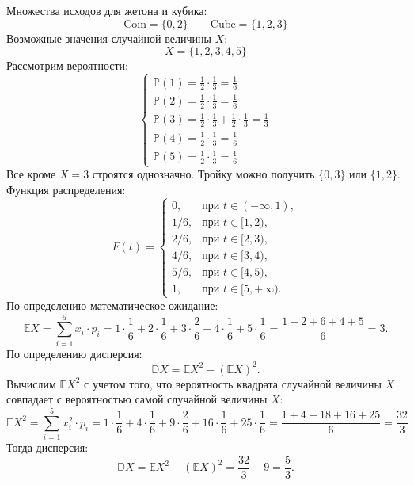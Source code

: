 \documentclass{article}
\begin{document}
\begin{enumerate}
Множества исходов для жетона и кубика:
\begin{equation}
    \text{Coin} = \{0, 2\} \qquad \text{Cube} = \{1, 2, 3\}
\end{equation}
Возможные значения случайной величины $X$:
\begin{equation}
    X = \{1, 2, 3, 4, 5\}
\end{equation}
Рассмотрим вероятности:
\begin{equation}
    \begin{cases}
        \mathbb{P}(1) = \frac{1}{2} \cdot \frac{1}{3} = \frac{1}{6} \\
        \mathbb{P}(2) = \frac{1}{2} \cdot \frac{1}{3} = \frac{1}{6} \\
        \mathbb{P}(3) = \frac{1}{2} \cdot \frac{1}{3} + \frac{1}{2} \cdot \frac{1}{3} = \frac{1}{3} \\
        \mathbb{P}(4) = \frac{1}{2} \cdot \frac{1}{3} = \frac{1}{6} \\
        \mathbb{P}(5) = \frac{1}{2} \cdot \frac{1}{3} = \frac{1}{6}
    \end{cases}
\end{equation}
Все кроме $X=3$ строятся однозначно. Тройку можно получить $\{0, 3\}$ или $\{1, 2\}$. Функция распределения:
\begin{equation}
    F(t) = \begin{cases}
        0, &\text{при } t \in (-\infty, 1),\\
        1/6, &\text{при } t \in [1, 2),\\
        2/6, &\text{при } t \in [2, 3),\\
        4/6, &\text{при } t \in [3, 4),\\
        5/6, &\text{при } t \in [4, 5),\\
        1, &\text{при } t \in [5, +\infty).
    \end{cases}
\end{equation}
По определению математическое ожидание:
\begin{equation}
    \mathbb{E}X = \sum_{i=1}^{5} x_i \cdot p_i = 1 \cdot \frac{1}{6} + 2 \cdot \frac{1}{6} + 3 \cdot \frac{2}{6} + 4 \cdot \frac{1}{6} + 5 \cdot \frac{1}{6} = \frac{1+2+6+4+5}{6} = 3.
\end{equation}
По определению дисперсия:
\begin{equation}
    \mathbb{D}X = \mathbb{E}X^2 - (\mathbb{E}X)^2.
\end{equation}
Вычислим $\mathbb{E}X^2$ с учетом того, что вероятность квадрата случайной величины $X$ совпадает с вероятностью самой случайной величины $X$:
\begin{equation}
    \mathbb{E}X^2 = \sum_{i=1}^{5} x_i^2 \cdot p_i = 1 \cdot \frac{1}{6} + 4 \cdot \frac{1}{6} + 9 \cdot \frac{2}{6} + 16 \cdot \frac{1}{6} + 25 \cdot \frac{1}{6} = \frac{1+4+18+16+25}{6} = \frac{32}{3}
\end{equation}
Тогда дисперсия:
\begin{equation}
    \mathbb{D}X = \mathbb{E}X^2 - (\mathbb{E}X)^2 = \frac{32}{3} - 9 = \frac{5}{3}.
\end{equation}


\end{enumerate}
\end{document}
